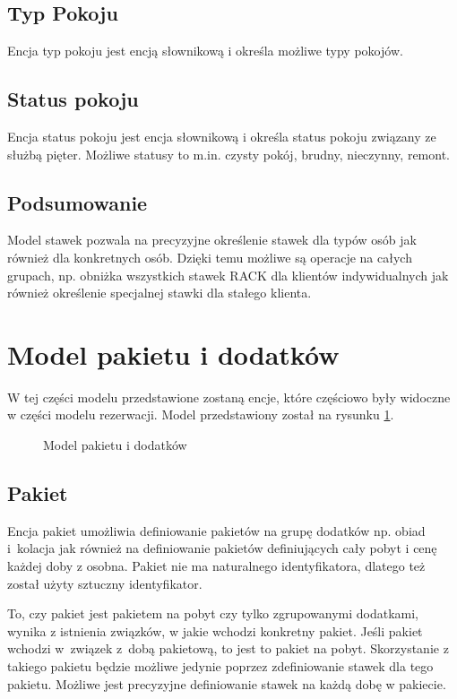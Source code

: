 \documentclass[a4paper,onecolumn,oneside,11pt,wide,floatssmall]{mwrep}
\theoremstyle{definition}
\theoremstyle{plain}%
\theoremstyle{remark}
\begin{document}
\subsection{Typ Pokoju}
Encja typ pokoju jest encją słownikową i określa możliwe typy pokojów.

\subsection{Status pokoju}
Encja status pokoju jest encja słownikową i określa status pokoju związany ze służbą pięter. Możliwe statusy to m.in. czysty pokój, brudny, nieczynny, remont.

\subsection{Podsumowanie}
Model stawek pozwala na precyzyjne określenie stawek dla typów osób jak również dla konkretnych osób. Dzięki temu możliwe są operacje na całych grupach, np. obniżka wszystkich stawek RACK dla klientów indywidualnych jak również określenie specjalnej stawki dla stałego klienta.


\section{Model pakietu i dodatków}
\label{model-pakietu-i-dodatkow}
W tej części modelu przedstawione zostaną encje, które częściowo były widoczne w części modelu rezerwacji. Model przedstawiony został na rysunku \ref{fig:db-logical-model-package}.

\begin{figure}[H]
  \begin{center}
  \end{center}
  \caption{Model pakietu i dodatków}
  \label{fig:db-logical-model-package}
\end{figure}

\subsection{Pakiet}
Encja pakiet umożliwia definiowanie pakietów na grupę dodatków np. obiad \mbox{i kolacja} jak również na definiowanie pakietów definiujących cały pobyt i cenę każdej doby z osobna. Pakiet nie ma naturalnego identyfikatora, dlatego też został użyty sztuczny identyfikator.

To, czy pakiet jest pakietem na pobyt czy tylko zgrupowanymi dodatkami, wynika z istnienia związków, w jakie wchodzi konkretny pakiet. Jeśli pakiet wchodzi \mbox{w związek} \mbox{z dobą} pakietową, to jest to pakiet na pobyt. Skorzystanie z takiego pakietu będzie możliwe jedynie poprzez zdefiniowanie stawek dla tego pakietu. Możliwe jest precyzyjne definiowanie stawek na każdą dobę w pakiecie.
\end{document}
